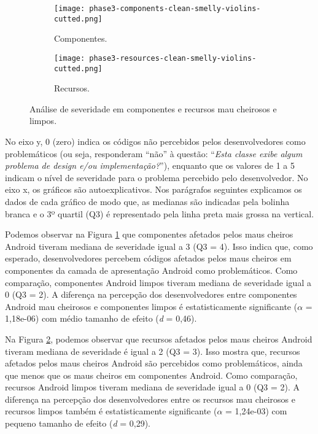 \begin{figure*}[!htb]
\centering
{}\textwidth
\captionsetup[subfigure]{width=.9\imagewidth,justification=raggedright}%
\begin{subfigure}[t]{.49\textwidth}
  \centering
  \hspace*{-1cm}%
  \texttt{[image: phase3-components-clean-smelly-violins-cutted.png]}
  \caption{Componentes.}
  \label{fig:components-violins}
\end{subfigure}
\begin{subfigure}[t]{.49\textwidth}
  \centering
  \texttt{[image: phase3-resources-clean-smelly-violins-cutted.png]}
  \caption{Recursos.}
  \label{fig:resources-violins}
\end{subfigure}%
\caption{Análise de severidade em componentes e recursos mau cheirosos e limpos.}
\label{fig:smelly-clean-consolidado}
\end{figure*}

No eixo y, 0 (zero) indica os códigos não percebidos pelos desenvolvedores como problemáticos (ou seja, responderam ``não'' à questão: ``\emph{Esta classe exibe algum problema de design e/ou implementação?}''), enquanto que os valores de 1 a 5 indicam o nível de severidade para o problema percebido pelo desenvolvedor. No eixo x, os gráficos são autoexplicativos. Nos parágrafos seguintes explicamos os dados de cada gráfico de modo que, as medianas são indicadas pela bolinha branca e o 3º quartil (Q3) é representado pela linha preta mais grossa na vertical.

Podemos observar na Figura \ref{fig:components-violins} que componentes afetados pelos maus cheiros Android tiveram mediana de severidade igual a 3 (Q3 = 4). Isso indica que, como esperado, desenvolvedores percebem códigos afetados pelos maus cheiros em componentes da camada de apresentação Android como problemáticos. Como comparação, componentes Android limpos tiveram mediana de severidade igual a 0 (Q3 = 2). A diferença na percepção dos desenvolvedores entre componentes Android mau cheirosos e componentes limpos é estatisticamente significante ($\alpha$ = 1,18e-06) com médio tamanho de efeito (\textit{d} = 0,46).

Na Figura \ref{fig:resources-violins}, podemos observar que recursos afetados pelos maus cheiros Android tiveram mediana de severidade é igual a 2 (Q3 = 3). Isso mostra que, recursos afetados pelos maus cheiros Android são percebidos como problemáticos, ainda que menos que os maus cheiros em componentes Android. Como comparação, recursos Android limpos tiveram mediana de severidade igual a 0 (Q3 = 2). A diferença na percepção dos desenvolvedores entre os recursos mau cheirosos e recursos limpos também é estatisticamente significante ($\alpha$ = 1,24e-03) com pequeno tamanho de efeito (\textit{d} = 0,29).

